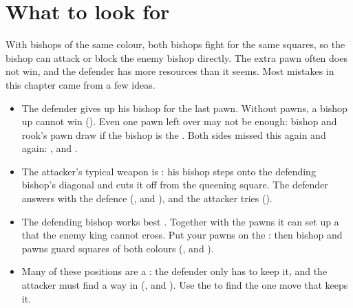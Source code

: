\section*{What to look for}
With bishops of the same colour, both bishops fight for the same squares, so the bishop can attack
or block the enemy bishop directly. The extra pawn often does not win, and the defender has more
resources than it seems. Most mistakes in this chapter came from a few ideas.

\begin{itemize}
\item The defender gives up his bishop for the last pawn. Without pawns, a bishop up cannot win
(). Even one
pawn left over may not be enough: bishop and rook's pawn draw if the bishop is the
.
Both sides missed this again and again: ,
 and .

\item The attacker's typical weapon is : his bishop
steps onto the defending bishop's diagonal and cuts it off from the queening square. The defender
answers with the
 defence (,
 and ), and the
attacker tries
().

\item The defending bishop works best . Together with the pawns it can set up a
 that the enemy king cannot cross. Put your pawns on the
: then bishop and pawns guard
squares of both colours (,
 and ).

\item Many of these positions are a : the defender only has to keep
it, and the attacker must find a way in (,
 and ). Use the
 to find the one move
that keeps it.


\end{itemize}
